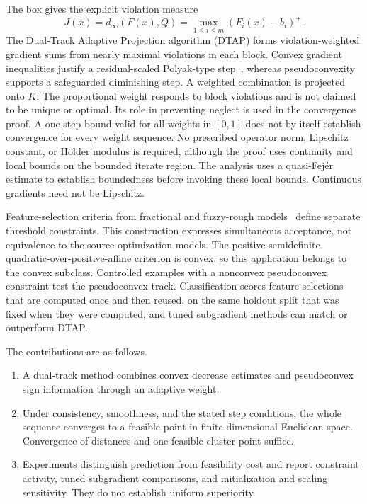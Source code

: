 \documentclass[]{interact}
\theoremstyle{plain}
\theoremstyle{definition}
\theoremstyle{remark}
\newcommand{\dtap}{\textsc{DTAP}}
\begin{document}
The box gives the explicit violation measure
\[
J(x)=d_\infty(F(x),Q)=\max_{1\le i\le m}(F_i(x)-b_i)^+.
\]
The Dual-Track Adaptive Projection algorithm (\dtap) forms violation-weighted gradient sums from nearly maximal violations in each block. Convex gradient inequalities justify a residual-scaled Polyak-type step~\citep{polyak1969,lopez2012}, whereas pseudoconvexity supports a safeguarded diminishing step. A weighted combination is projected onto $K$. The proportional weight responds to block violations and is not claimed to be unique or optimal. Its role in preventing neglect is used in the convergence proof. A one-step bound valid for all weights in $[0,1]$ does not by itself establish convergence for every weight sequence. No prescribed operator norm, Lipschitz constant, or H\"older modulus is required, although the proof uses continuity and local bounds on the bounded iterate region. The analysis uses a quasi-Fej\'er estimate to establish boundedness before invoking these local bounds. Continuous gradients need not be Lipschitz.

Feature-selection criteria from fractional and fuzzy-rough models~\citep{wang2021fractional,wang2026afrsfcv} define separate threshold constraints. This construction expresses simultaneous acceptance, not equivalence to the source optimization models. The positive-semidefinite quadratic-over-positive-affine criterion is convex, so this application belongs to the convex subclass. Controlled examples with a nonconvex pseudoconvex constraint test the pseudoconvex track. Classification scores feature selections that are computed once and then reused, on the same holdout split that was fixed when they were computed, and tuned subgradient methods can match or outperform DTAP.

The contributions are as follows.
\begin{enumerate}[label=\textbf{C\arabic*.},leftmargin=2.4em,itemsep=3pt]
\item A dual-track method combines convex decrease estimates and pseudoconvex sign information through an adaptive weight.
\item Under consistency, smoothness, and the stated step conditions, the whole sequence converges to a feasible point in finite-dimensional Euclidean space. Convergence of distances and one feasible cluster point suffice.
\item Experiments distinguish prediction from feasibility cost and report constraint activity, tuned subgradient comparisons, and initialization and scaling sensitivity. They do not establish uniform superiority.
\end{enumerate}
\end{document}
